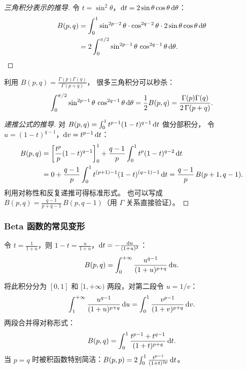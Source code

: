 \documentclass{ctexart}
\begin{document}
\begin{proof}[三角积分表示的推导]
  令 $t = \sin^2\theta$，$\mathrm{d} t = 2\sin\theta\cos\theta\,\mathrm{d}\theta$：
  \begin{align*}
    B(p,q) &= \int_0^1 \sin^{2p-2}\theta \cdot \cos^{2q-2}\theta \cdot 2\sin\theta\cos\theta \,\mathrm{d}\theta \\
    &= 2\int_0^{\pi/2} \sin^{2p-1}\theta\,\cos^{2q-1}\theta \,\mathrm{d}\theta.
  \end{align*}
\end{proof}

\begin{remark}
  利用 $B(p,q) = \frac{\Gamma(p)\Gamma(q)}{\Gamma(p+q)}$，
  很多三角积分可以秒杀：
  \[
    \int_0^{\pi/2}\sin^{2p-1}\theta\,\cos^{2q-1}\theta\,\mathrm{d}\theta
    = \frac{1}{2}B(p,q)
    = \frac{\Gamma(p)\Gamma(q)}{2\,\Gamma(p+q)}.
  \]
\end{remark}

\begin{proof}[递推公式的推导]
  对 $B(p,q) = \int_0^1 t^{p-1}(1-t)^{q-1}\,\mathrm{d} t$ 做分部积分，
  令 $u = (1-t)^{q-1}$，$\mathrm{d} v = t^{p-1}\,\mathrm{d} t$：
  \begin{align*}
    B(p,q) &= \left[\frac{t^p}{p}(1-t)^{q-1}\right]_0^1
    + \frac{q-1}{p}\int_0^1 t^p(1-t)^{q-2}\,\mathrm{d} t \\
    &= 0 + \frac{q-1}{p}\int_0^1 t^{(p+1)-1}(1-t)^{(q-1)-1}\,\mathrm{d} t
    = \frac{q-1}{p}\,B(p+1,q-1).
  \end{align*}
  利用对称性和反复递推可得标准形式。
  也可以写成 $B(p,q) = \frac{q-1}{p+q-1}\,B(p,q-1)$（用 $\Gamma$ 关系直接验证）。
\end{proof}

\subsubsection*{Beta 函数的常见变形}

令 $t = \frac{1}{1+u}$，则 $1-t = \frac{u}{1+u}$，$\mathrm{d} t = -\frac{\mathrm{d} u}{(1+u)^2}$：
\[
  B(p,q) = \int_0^{+\infty}\frac{u^{q-1}}{(1+u)^{p+q}}\,\mathrm{d} u.
\]

将此积分分为 $[0,1]$ 和 $[1,+\infty)$ 两段，对第二段令 $u = 1/v$：
\[
  \int_1^{+\infty}\frac{u^{q-1}}{(1+u)^{p+q}}\,\mathrm{d} u
  = \int_0^1 \frac{v^{p-1}}{(1+v)^{p+q}}\,\mathrm{d} v.
\]
两段合并得对称形式：
\[
  B(p,q) = \int_0^1 \frac{t^{p-1}+t^{q-1}}{(1+t)^{p+q}}\,\mathrm{d} t.
\]
当 $p = q$ 时被积函数特别简洁：$B(p,p) = 2\int_0^1\frac{t^{p-1}}{(1+t)^{2p}}\,\mathrm{d} t$。

\end{document}
